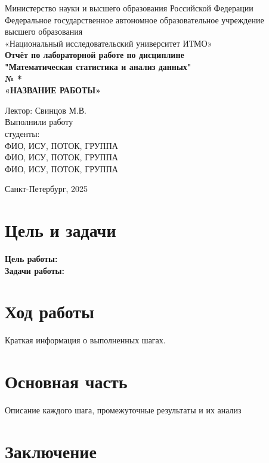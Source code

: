 \documentclass[a4paper,12pt]{article}
\begin{document}
\thispagestyle{empty}
\begin{center}
    \large
    Министерство науки и высшего образования Российской Федерации\\
    Федеральное государственное автономное образовательное учреждение\\
    высшего образования\\
    «Национальный исследовательский университет ИТМО»\\
    \vspace{5cm}
    \textbf{Отчёт по лабораторной работе по дисциплине \\
    "Математическая статистика и анализ данных"\\
     № *}\\
     \vspace{1cm}
    \textbf{«НАЗВАНИЕ РАБОТЫ»}\\
    \vspace{4cm}
    \begin{flushright}
        Лектор: Свинцов М.В.\\
        \vspace{1cm}
        Выполнили работу\\ студенты:\\
        \vspace{1cm}
        ФИО, ИСУ, ПОТОК, ГРУППА \\
        \vspace{0.5cm}
        ФИО, ИСУ, ПОТОК, ГРУППА \\
        \vspace{0.5cm}
        ФИО, ИСУ, ПОТОК, ГРУППА \\
        \vspace{0.5cm}
    \end{flushright}
    \vspace{2cm}
    \begin{center}
        Санкт-Петербург, 2025\\
    \end{center}
\end{center}

\tableofcontents

\newpage

\newpage
\section{Цель и задачи}
\textbf{Цель работы:}\\
\textbf{Задачи работы:}

\newpage

\section{Ход работы}
Краткая информация о выполненных шагах.

\newpage

\section{Основная часть}
Описание каждого шага, промежуточные результаты и их анализ

\newpage

\section{Заключение}
\end{document}
